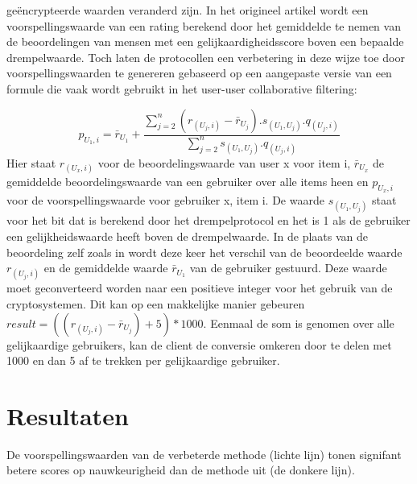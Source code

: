 \documentclass[twocolumn]{phdsymp} %
\begin{document}
ge\"encrypteerde waarden veranderd zijn. In het origineel artikel \cite{dyn} wordt een voorspellingswaarde van een rating berekend door het gemiddelde te nemen van de beoordelingen van mensen met een gelijkaardigheidsscore boven een bepaalde drempelwaarde. Toch laten de protocollen een verbetering in deze wijze toe door voorspellingswaarden te genereren gebaseerd op een aangepaste versie van een formule die vaak wordt gebruikt in het user-user collaborative filtering:

\begin{equation}\label{stdrecom}p_{U_1,i} = \bar{r}_{U_1} + \frac{\sum_{j=2}^{n}(r_{(U_j,i)} - \bar{r}_{U_j}).s_{(U_1,U_j)}.q_{(U_j,i)}}{\sum_{j=2}^{n} s_{(U_1,U_j)}.q_{(U_j,i)} }
\end{equation}
Hier staat $r_{(U_x,i)}$ voor de beoordelingswaarde van user x voor item i, $\bar{r}_{U_x}$ de gemiddelde beoordelingswaarde van een gebruiker over alle items heen en $p_{U_x,i}$ voor de voorspellingswaarde voor gebruiker x, item i.
De waarde $s_{(U_1,U_j)}$ staat voor het bit dat is berekend door het drempelprotocol en het is 1 als de gebruiker een gelijkheidswaarde heeft boven de drempelwaarde. In de plaats van de beoordeling zelf zoals in \cite{dyn} wordt deze keer het verschil van de beoordeelde waarde $r_{(U_j,i)}$ en de gemiddelde waarde $\bar{r}_{U_1}$ van de gebruiker gestuurd. Deze waarde moet geconverteerd worden naar een positieve integer voor het gebruik van de cryptosystemen. Dit kan op een makkelijke manier gebeuren $result = ((r_{(U_j,i)} - \bar{r}_{U_j})+5)*1000$. Eenmaal de som is genomen over alle gelijkaardige gebruikers, kan de client de conversie omkeren door te delen met 1000 en dan 5 af te trekken per gelijkaardige gebruiker.


\section{Resultaten}

De voorspellingswaarden van de verbeterde methode (lichte lijn) tonen signifant betere scores op nauwkeurigheid dan de methode uit \cite{dyn} (de donkere lijn).
\end{document}
